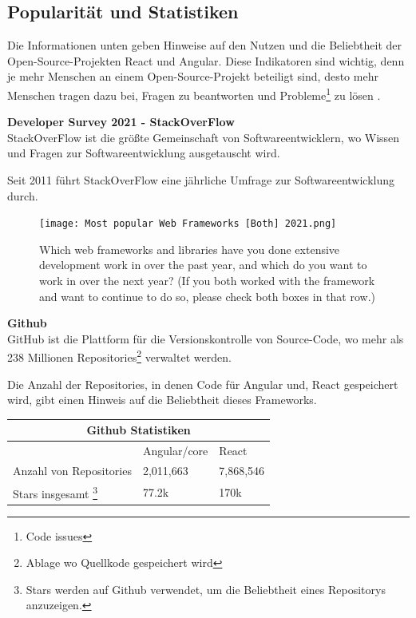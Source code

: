 \newpage    
\subsection{Popularität und Statistiken}
Die Informationen unten geben Hinweise auf den Nutzen und die Beliebtheit der Open-Source-Projekten React und Angular.  
Diese Indikatoren sind wichtig, denn je mehr Menschen an einem Open-Source-Projekt beteiligt sind, desto mehr Menschen tragen dazu bei, Fragen zu beantworten und Probleme\footnote{Code issues} zu lösen {\cite{LIN1}}.
\begin{flushleft}
  \textbf{Developer Survey 2021 - StackOverFlow}\\
  StackOverFlow ist die größte Gemeinschaft von Softwareentwicklern, wo Wissen und Fragen zur Softwareentwicklung ausgetauscht wird.

  Seit 2011 führt StackOverFlow eine jährliche Umfrage zur Softwareentwicklung durch.

\begin{figure}[h]
  \centering
  \texttt{[image: Most popular Web Frameworks [Both] 2021.png]}
  \caption{ Which web frameworks and libraries have you done extensive development work in over the past year, and which do you want to work in over the next year? (If you both worked with the framework and want to continue to do so, please check both boxes in that row.) {\cite{SO01}}}

\end{figure}
\end{flushleft}

\newpage

\begin{flushleft}
  \textbf{Github}\\
  GitHub ist die Plattform für die Versionskontrolle von Source-Code, wo mehr als 238 Millionen Repositories\footnote{Ablage wo Quellkode gespeichert wird} verwaltet werden{\cite{GH07}}.  
\end{flushleft}

Die Anzahl der Repositories, in denen Code für Angular und, React gespeichert wird, gibt einen Hinweis auf die Beliebtheit dieses Frameworks.
\\
\begin{table}[h!]
  \centering
  \begin{tabular}{ |p{5cm}||p{3.6cm}|p{3.6cm}|  }
    \hline
    \multicolumn{3}{|c|}{Github Statistiken}                        \\
    \hline
                            & Angular/core        & React     \\
    \hline
    Anzahl von     Repositories & 2,011,663 & 7,868,546
    \\

   \hline
    Stars insgesamt \footnote{Stars werden auf Github verwendet, um die Beliebtheit eines Repositorys anzuzeigen.} & 77.2k          & 170k
   \\
    \hline
  \end{tabular}
\end{table}


